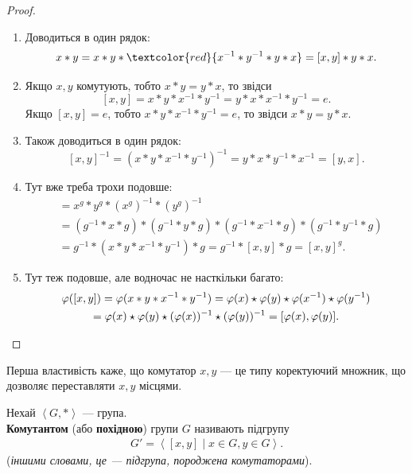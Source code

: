 \documentclass{math_library}
\begin{document}
\begin{proof}
\begin{enumerate}[topsep=0pt,wide=0pt,label={\arabic*)}]
\item Доводиться в один рядок:
\[ 
x*y = x*y*\textcolor{red}{x^{-1}*y^{-1}*y*x} = [x,y]*y*x.
\]
\item Якщо $x,y$ комутують, тобто $x*y=y*x$, то звідси 
\[
[x,y] = x*y*x^{-1}*y^{-1} = y*x*x^{-1}*y^{-1} = e.
\]
Якщо $[x,y] = e$, тобто $x*y*x^{-1}*y^{-1} = e$, то звідси $x*y = y*x$.

\item Також доводиться в один рядок: 
\[
[x,y]^{-1} = (x*y*x^{-1}*y^{-1})^{-1} = y*x*y^{-1}*x^{-1} = [y,x].
\]
\item Тут вже треба трохи подовше:
\begin{align*}
[x^g,y^g] & = x^g*y^g*(x^g)^{-1}*(y^g)^{-1} \\
& = (g^{-1}*x*g)*(g^{-1}*y*g)*(g^{-1}*x^{-1}*g)*(g^{-1}*y^{-1}*g) \\
& = g^{-1}*(x*y*x^{-1}*y^{-1})*g = g^{-1}*[x,y]*g = [x,y]^g.
\end{align*}

\item Тут теж подовше, але водночас не насткільки багато:
\begin{gather*}
\varphi([x,y]) = \varphi(x*y*x^{-1}*y^{-1}) = \varphi(x) \star \varphi(y) \star \varphi(x^{-1}) \star \varphi(y^{-1}) \\ 
= \varphi(x) \star \varphi(y) \star (\varphi(x))^{-1} \star (\varphi(y))^{-1} = [\varphi(x),\varphi(y)]. \qedhere
\end{gather*}
\end{enumerate}
\end{proof}

\begin{remark}
Перша властивість каже, що комутатор $x,y$ --- це типу коректуючий множник, що дозволяє переставляти $x,y$ місцями.
\end{remark}

\begin{definition}
Нехай $\left<G,*\right>$ --- група.\\
\textbf{Комутантом} (або \textbf{похідною}) групи $G$ називають підгрупу
\begin{align*}
G' = \left< [x,y] \mid x \in G, y \in G \right>.
\end{align*}
(\textit{іншими словами, це --- підгрупа, породжена комутаторами}).
\end{definition}
\end{document}
